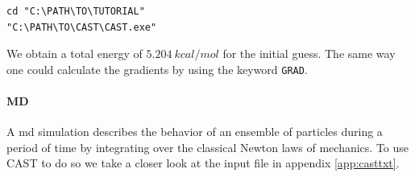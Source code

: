 \documentclass[a4paper,11pt]{scrartcl}
\begin{document}
\begin{lstlisting}[frame=single,]
cd "C:\PATH\TO\TUTORIAL"
"C:\PATH\TO\CAST\CAST.exe"
\end{lstlisting} 

We obtain a total energy of $5.204~kcal/mol$ for the initial guess. The same way one could calculate the gradients by using the keyword \texttt{GRAD}.

\paragraph{MD}%
A \ac{md} simulation describes the behavior of an ensemble of particles during a period of time by integrating over the classical Newton laws of mechanics. To use CAST to do so we take a closer look at the input file in appendix \ref{app:casttxt}. 
\end{document}
